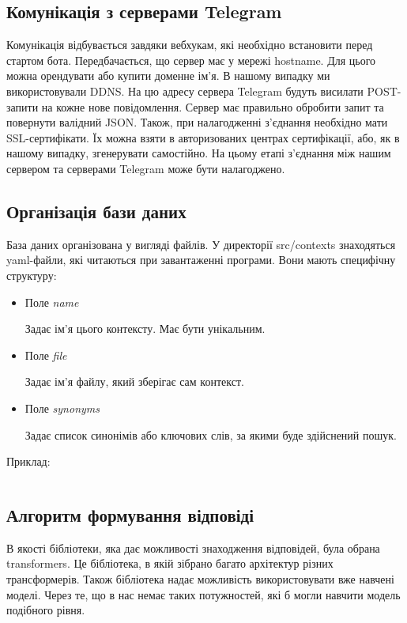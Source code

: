 \documentclass[a4paper,14pt]{extreport}
\begin{document}
    \subsection{Комунікація з серверами Telegram}
    Комунікація відбувається завдяки вебхукам, які необхідно встановити перед стартом бота. Передбачається, що сервер має у мережі hostname. Для цього можна орендувати або купити доменне ім'я. В нашому випадку ми використовували DDNS. На цю адресу сервера Telegram будуть висилати POST-запити на кожне нове повідомлення. Сервер має правильно обробити запит та повернути валідний JSON. Також, при налагодженні з'єднання необхідно мати SSL-сертифікати. Їх можна взяти в авторизованих центрах сертифікації, або, як в нашому випадку, згенерувати самостійно. На цьому етапі з'єднання між нашим сервером та серверами Telegram може бути налагоджено.

    \subsection{Організація бази даних}
    База даних організована у вигляді файлів. У директорії src/contexts знаходяться yaml-файли, які читаються при завантаженні програми. Вони мають специфічну структуру:
    \begin{itemize}
        \item Поле \it{name}

            Задає ім'я цього контексту. Має бути унікальним.

        \item Поле \it{file}

            Задає ім'я файлу, який зберігає сам контекст.

        \item Поле \it{synonyms}

            Задає список синонімів або ключових слів, за якими буде здійснений пошук.
    \end{itemize}
    Приклад:
    \inputminted[breaklines,linenos=true]{yaml}{./sample.yaml}

    \subsection{Алгоритм формування відповіді}
    В якості бібліотеки, яка дає можливості знаходження відповідей, була обрана transformers. Це бібліотека, в якій зібрано багато архітектур різних трансформерів. Також бібліотека надає можливість використовувати вже навчені моделі. Через те, що в нас немає таких потужностей, які б могли навчити модель подібного рівня.
\end{document}
